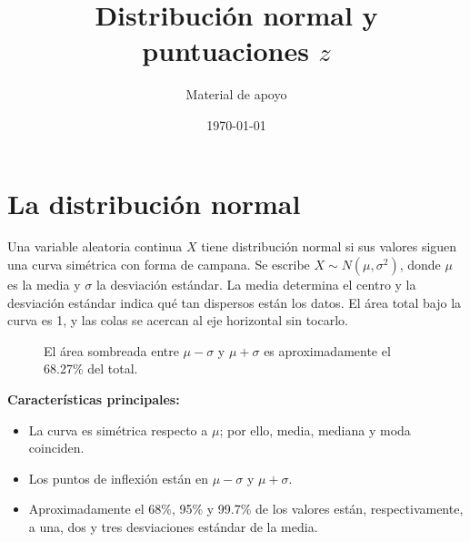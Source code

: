 \documentclass[11pt]{article}
\title{Distribución normal y puntuaciones $z$}
\author{Material de apoyo}
\date{\today}
\begin{document}
\maketitle

\section{La distribución normal}

Una variable aleatoria continua $X$ tiene distribución normal si sus valores siguen una curva simétrica con forma de campana. Se escribe $X\sim N(\mu,\sigma^2)$, donde $\mu$ es la media y $\sigma$ la desviación estándar. La media determina el centro y la desviación estándar indica qué tan dispersos están los datos. El área total bajo la curva es 1, y las colas se acercan al eje horizontal sin tocarlo.

\begin{figure}[htbp]
\centering
{}
\caption{El área sombreada entre $\mu-\sigma$ y $\mu+\sigma$ es aproximadamente el 68.27\% del total.}
\label{fig:normal-general}
\end{figure}

\textbf{Características principales:}
\begin{itemize}
  \item La curva es simétrica respecto a $\mu$; por ello, media, mediana y moda coinciden.
  \item Los puntos de inflexión están en $\mu-\sigma$ y $\mu+\sigma$.
  \item Aproximadamente el 68\%, 95\% y 99.7\% de los valores están, respectivamente, a una, dos y tres desviaciones estándar de la media.
\end{itemize}
\end{document}

